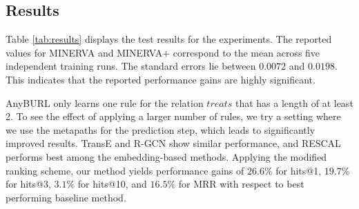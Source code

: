\documentclass{article}
\begin{document}
\subsection{Results}
\label{sec:results}

\begin{table}[h]
\caption{Comparison with baseline methods.%
}
\begin{center}
\label{tab:results}
\end{center}
\end{table}

Table \ref{tab:results} displays the test results for the experiments. 
The reported values for MINERVA and MINERVA+ correspond to the mean across five independent training runs. The standard errors lie between $0.0072$ and $0.0198$. This indicates that the reported performance gains are highly significant. %


AnyBURL only learns one rule for the relation $treats$ that has a length of at least 2. 
To see the effect of applying a larger number of rules, we try a setting where we use the metapaths for the prediction step, which leads to significantly improved results.
TransE and R-GCN show similar performance, and RESCAL performs best among the embedding-based methods.
Applying the modified ranking scheme, our method yields performance gains of $26.6\%$ for hits@1, $19.7\%$ for hits@3, $3.1\%$ for hits@10, and $16.5\%$ for MRR with respect to best performing baseline method.%
 
\end{document}
